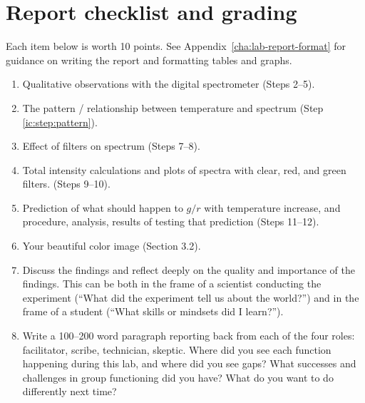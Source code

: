 \section{Report checklist and grading}

Each item below is worth 10 points. See Appendix\ \ref{cha:lab-report-format} for guidance on writing the report and formatting tables and graphs.

\begin{enumerate}
	\item Qualitative observations with the digital spectrometer (Steps 2--5).
	\item The pattern / relationship between temperature and spectrum (Step \ref{ic:step:pattern}).
	\item Effect of filters on spectrum (Steps 7--8).
	\item Total intensity calculations and plots of spectra with clear, red, and green filters. (Steps 9--10).
	\item Prediction of what should happen to $g/r$ with temperature increase, and procedure, analysis, results of testing that prediction (Steps 11--12).
	\item Your beautiful color image (Section 3.2).
	\item Discuss the findings and reflect deeply on the quality and importance of
	the findings. This can be both in the frame of a scientist conducting the
	experiment (“What did the experiment tell us about the world?”) and in the
	frame of a student (“What skills or mindsets did I learn?”).
	\item Write a 100--200 word paragraph reporting back from each of the four roles: facilitator, scribe, technician, skeptic. Where did you see each function happening during this lab, and where did you see gaps? What successes and challenges in group functioning did you have? What do you want to do differently next time?
\end{enumerate}
